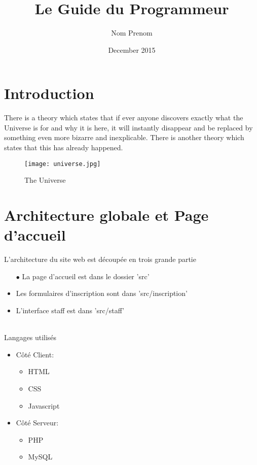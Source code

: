 \documentclass{article}
\title{Le Guide du Programmeur}
\author{Nom Prenom }
\date{December 2015}
\begin{document}
\maketitle

\section{Introduction}

There is a theory which states that if ever anyone discovers exactly what the Universe is for and why it is here, it will instantly disappear and be replaced by something even more bizarre and inexplicable.
There is another theory which states that this has already happened.

\begin{figure}[h!]
\centering
\texttt{[image: universe.jpg]}
\caption{The Universe}
\label{fig:univerise}
\end{figure}

\section{Architecture globale et Page d'accueil}

L'architecture du site web est découpée en trois grande partie

\begin{itemize}
\item[$\bullet$] La page d'accueil est dans le dossier 'src'
\item Les formulaires d'inscription sont dans 'src/inscription'
\item L'interface staff est dans 'src/staff'
\end{itemize}\\

Langages utilisés
\begin{itemize}
\item Côté Client: \begin{itemize}
        \item HTML
        \item CSS
        \item Javascript
    \end{itemize}
\item Côté Serveur: \begin{itemize}
        \item PHP
        \item MySQL
    \end{itemize}
\end{itemize}\\
\end{document}
